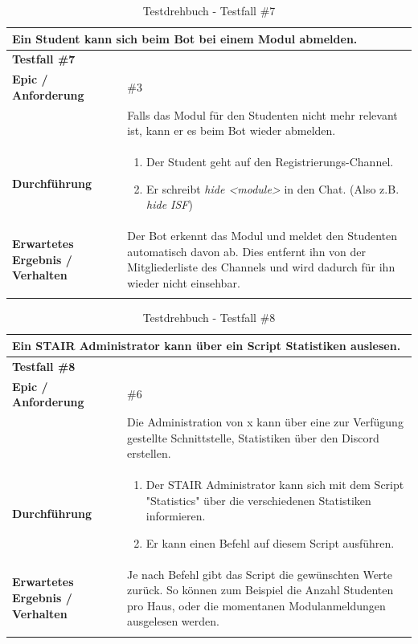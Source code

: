 \documentclass[a4paper, table]{article}
\begin{document}
\begin{longtable}[h]{|p{15em}|p{25em}|}
    \hline
    \multicolumn{2}{|l|}{\textbf{Ein Student kann sich beim Bot bei einem Modul abmelden.}} \\
    \hline
    \multicolumn{2}{|l|}{\textbf{Testfall \#7}} \\
    \hline
    \textbf{Epic / Anforderung} & \#3 \\*
     & Falls das Modul für den Studenten nicht mehr relevant ist, kann er es beim Bot wieder abmelden. \\
    \hline
    \textbf{Durchführung} &
    \begin{enumerate}
        \item Der Student geht auf den Registrierungs-Channel.
        \item Er schreibt \textit{hide <module>} in den Chat. (Also z.B. \textit{hide ISF})
    \end{enumerate}\\
    \hline
    \textbf{Erwartetes Ergebnis / Verhalten} & Der Bot erkennt das Modul und meldet den Studenten automatisch davon ab.
    Dies entfernt ihn von der Mitgliederliste des Channels und wird dadurch für ihn wieder nicht einsehbar. \\
    \hline
    \caption{Testdrehbuch - Testfall \#7}
\end{longtable}

\begin{longtable}[h]{|p{15em}|p{25em}|}
    \hline
    \multicolumn{2}{|l|}{\textbf{Ein STAIR Administrator kann über ein Script Statistiken auslesen.}} \\
    \hline
    \multicolumn{2}{|l|}{\textbf{Testfall \#8}} \\
    \hline
    \textbf{Epic / Anforderung} & \#6 \\*
     & Die Administration von x kann über eine zur Verfügung gestellte Schnittstelle, Statistiken über den Discord erstellen. \\
    \hline
    \textbf{Durchführung} &
    \begin{enumerate}
        \item Der STAIR Administrator kann sich mit dem Script "Statistics" über die verschiedenen Statistiken informieren.
        \item Er kann einen Befehl auf diesem Script ausführen.
    \end{enumerate}\\
    \hline
    \textbf{Erwartetes Ergebnis / Verhalten} & Je nach Befehl gibt das Script die gewünschten Werte zurück.
    So können zum Beispiel die Anzahl Studenten pro Haus, oder die momentanen Modulanmeldungen ausgelesen werden. \\
    \hline
    \caption{Testdrehbuch - Testfall \#8}
\end{longtable}
\clearpage
\end{document}
